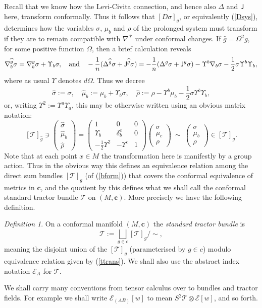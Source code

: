 \documentclass[a4paper,12pt]{amsart}
\def\Cal{\mathcal}
\newcommand{\J}{\mbox{\sf J}}
\newcommand{\cc}{\boldsymbol{c}}
\newcommand{\ce}{{\Cal E}}
\newcommand{\cT}{{\mathcal T}}
\newcommand{\si}{\sigma}
\theoremstyle{remark}
\newcommand{\nn}[1]{(\ref{#1})}
\newtheorem{definition}{Definition}
\begin{document}
Recall that we know how the Levi-Civita connection,
and hence also $\Delta$ and $\J$ here, transform conformally. Thus it
follows that $[D \sigma ]_g$, or equivalently \nn{Dsys}, determines
how the variables $\sigma$, $\mu_b$ and $\rho$ of the prolonged system
must transform if they are to remain compatible with $\nabla^\cT$
under conformal changes. If $\widehat{g}=\Omega^2 g$, for some
positive function $\Omega$, then a brief calculation reveals
$$ \nabla^{\widehat{g}}_b\sigma =\nabla^{g}_b\sigma +
\Upsilon_b\sigma, \quad \mbox{and} \quad
-\frac{1}{n}(\Delta^{\widehat{g}} \si+ \J^{\widehat{g}} \sigma) =
-\frac{1}{n}(\Delta^{g} \si+ \J^{g} \sigma) -\Upsilon^b\nabla_b\sigma
-\frac{1}{2}\sigma\Upsilon^b \Upsilon_b ,
$$
where as usual $\Upsilon$ denotes $d \Omega$. Thus we decree
$$ 
\widehat{\sigma}:= \sigma, \quad \widehat{\mu}_b:=
\mu_b+\Upsilon_b\sigma, \quad \widehat{\rho}:= \rho -\Upsilon^b\mu_b
-\frac{1}{2}\sigma\Upsilon^b \Upsilon_b ,
$$
or, writing $\Upsilon^2:=\Upsilon^a\Upsilon_a$, this may be otherwise
written using an obvious matrix notation:
\begin{equation}\label{ttrans}
[\cT]_{\widehat{g}}\ni \left(\begin{array}{c}
\widehat{\sigma}\\
\widehat{\mu}_b\\
\widehat{\rho}
\end{array}\right)=
\left(\begin{array}{ccc}
1 & 0 & 0\\
\Upsilon_b & \delta^c_b & 0\\
-\frac{1}{2}\Upsilon^2 & -\Upsilon^c & 1
\end{array}\right)\left(\begin{array}{c}
\sigma\\
\mu_c\\
\rho
\end{array}\right)~\sim~ \left(\begin{array}{c}
\sigma\\
\mu_b\\
\rho
\end{array}\right)\in [\cT]_g.
\end{equation} 
Note that at each point $x\in M$ the transformation here is manifestly
by a group action. Thus in the obvious way this defines an equivalence
relation among the direct sum bundles $[\cT]_g$ (of \nn{bform}) that
covers the conformal equivalence of metrics in $\cc$, and the quotient
by this defines what we shall call the conformal standard tractor
bundle $\cT$ on $(M,\cc)$. More precisely we have the following
definition.
\begin{definition}\label{cTdef} On a conformal manifold $(M,\cc)$
the {\em standard tractor bundle} is 
$$
\cT:= \bigsqcup_{g\in c} [\cT]_g /\sim ,
$$ meaning the disjoint union of the $[\cT]_g$ (parameterised by $g\in
c$) modulo equivalence relation given by \nn{ttrans}. We shall also use the 
abstract index notation $\ce_A$ for $\cT$.
\end{definition}
We shall carry many conventions from tensor calculus over to bundles
and tractor fields. For example we shall write $ \ce_{(AB)} [w]$ to
mean $S^2 \cT \otimes \ce[w]$, and so forth. 
\end{document}
